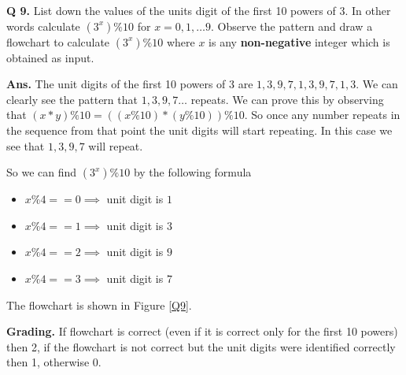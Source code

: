 \documentclass{article}
\begin{document}
\clearpage

\begin{flushleft}

\textbf{Q 9. } List down the values of the units digit of the first 10 powers of 3. In other words calculate
$(3^x) \% 10$ for $x = 0, 1, \ldots 9$. Observe the pattern and draw a flowchart to calculate $(3^x) \% 10$
where $x$ is any \textbf{non-negative} integer which is obtained as input. 

\end{flushleft}

\begin{flushleft}

\textbf{Ans.} The unit digits of the first 10 powers of 3 are $1, 3, 9, 7, 1, 3, 9, 7, 1, 3$. We can clearly 
see the pattern that $1, 3, 9, 7 \ldots$ repeats. We can prove this by observing that 
$(x * y) \% 10 = ((x \% 10) * (y \% 10)) \% 10$. So once any number repeats in the sequence from that point 
the unit digits will start repeating. In this case we see that $1, 3, 9, 7$ will repeat.

So we can find $(3^x) \% 10$ by the following formula

\begin{itemize}
    \item $x \% 4 == 0 \implies $ unit digit is $1$  
    \item $x \% 4 == 1 \implies $ unit digit is $3$  
    \item $x \% 4 == 2 \implies $ unit digit is $9$  
    \item $x \% 4 == 3 \implies $ unit digit is $7$  
\end{itemize}

The flowchart is shown in Figure \ref{Q9}.

\textbf{Grading.} If flowchart is correct (even if it is correct only for the first 10 powers) then 2, 
if the flowchart is not correct but the unit digits were identified correctly then 1, otherwise 0.

\end{flushleft}
\end{document}
